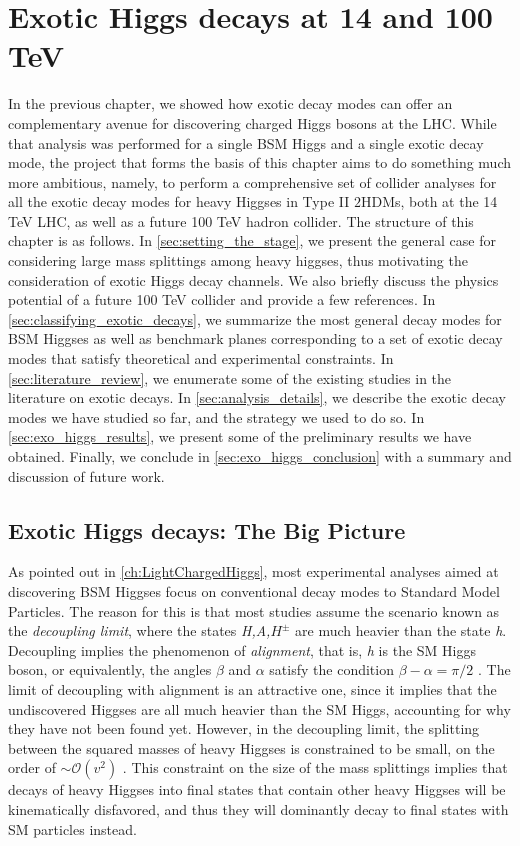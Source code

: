 \chapter{Exotic Higgs decays at 14 and 100 TeV}\label{ch:ExoticHiggs}

In the previous chapter, we showed how exotic decay modes can offer an complementary avenue for discovering charged Higgs bosons at the LHC. While that analysis was performed for a single BSM Higgs and a single exotic decay mode, the project that forms the basis of this chapter aims to do something much more ambitious, namely, to perform a comprehensive set of collider analyses for all the exotic decay modes for heavy Higgses in Type II $2$HDMs, both at the 14 TeV LHC, as well as a future 100 TeV hadron collider. The structure of this chapter is as follows. In \autoref{sec:setting_the_stage}, we present the general case for considering large mass splittings among heavy higgses, thus motivating the consideration of exotic Higgs decay channels. We also briefly discuss the physics potential of a future 100 TeV collider and provide a few references. In \autoref{sec:classifying_exotic_decays}, we summarize the most general decay modes for BSM Higgses as well as benchmark planes corresponding to a set of exotic decay modes that satisfy theoretical and experimental constraints. In \autoref{sec:literature_review}, we enumerate some of the existing studies in the literature on exotic decays. In \autoref{sec:analysis_details}, we describe the exotic decay modes we have studied so far, and the strategy we used to do so. In \autoref{sec:exo_higgs_results}, we present some of the preliminary results we have obtained. Finally, we conclude in \autoref{sec:exo_higgs_conclusion} with a summary and discussion of future work.

\section{Exotic Higgs decays: The Big Picture}\label{sec:setting_the_stage}
As pointed out in \autoref{ch:LightChargedHiggs}, most experimental analyses aimed at discovering BSM Higgses focus on conventional decay modes to Standard Model Particles. The reason for this is that most studies assume the scenario known as the \emph{decoupling limit}, where the states \emph{H,A,$H^\pm$} are much heavier than the state \emph{h}. Decoupling implies the phenomenon of \emph{alignment}, that is, \emph{h} is the SM Higgs boson, or equivalently, the angles $\beta$ and $\alpha$ satisfy the condition $\beta-\alpha = \pi/2$ \cite{Contino:2016spe}. The limit of decoupling with alignment is an attractive one, since it implies that the undiscovered Higgses are all much heavier than the SM Higgs, accounting for why they have not been found yet. However, in the decoupling limit, the splitting between the squared masses of heavy Higgses is constrained to be small, on the order of $\sim\mathcal{O}(v^2)$ \cite{Gunion:2002zf}.
This constraint on the size of the mass splittings implies that decays of heavy Higgses into final states that contain other heavy Higgses will be kinematically disfavored, and thus they will dominantly decay to final states with SM particles instead.

